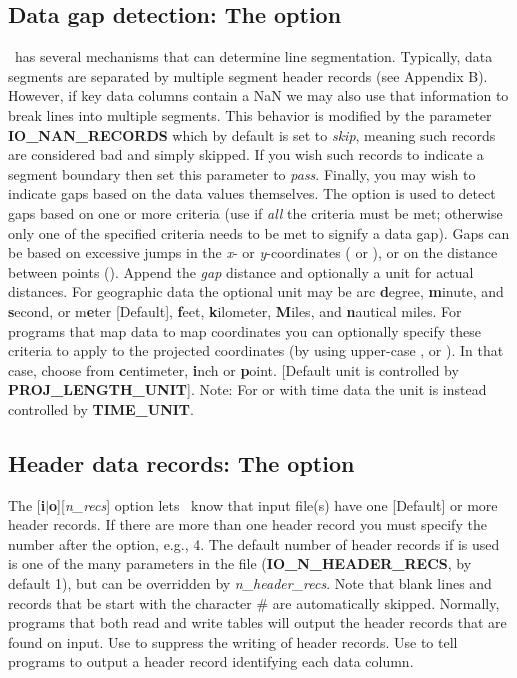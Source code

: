 \subsection{Data gap detection: The  option}
\label{sec:gap}
\GMT\ has several mechanisms that can determine line segmentation.  Typically, data segments are
separated by multiple segment header records (see Appendix B).  However, if key data
columns contain a NaN we may also use that information to break lines into multiple
segments.  This behavior is modified by the parameter \textbf{IO\_NAN\_RECORDS} which
by default is set to {\it skip}, meaning such records are considered bad and simply
skipped.  If you wish such records to indicate a segment boundary then set this parameter
to {\it pass}.  Finally, you may wish to indicate gaps based on the data values themselves.
The  option is used to detect gaps based on one or more criteria (use  if
\emph{all} the criteria must be met; otherwise only one of the specified criteria needs
to be met to signify a data gap).  Gaps can be based on excessive jumps in the {\it x}- or
{\it y}-coordinates ( or ), or on the distance between points ().
Append the {\it gap} distance and optionally a unit for actual distances.
For geographic data the optional unit may be arc {\bf d}egree, {\bf m}inute, and {\bf s}econd,
or m{\bf e}ter [Default], {\bf f}eet, {\bf k}ilometer, {\bf M}iles, and {\bf n}autical miles.
For programs that map data to map coordinates you can optionally specify these criteria to apply to
the projected coordinates (by using upper-case ,  or ).
In that case, choose from {\bf c}entimeter, {\bf i}nch or {\bf p}oint.
[Default unit is controlled by \textbf{PROJ\_LENGTH\_UNIT}].
Note: For  or  with time data the unit is instead controlled by \textbf{TIME\_UNIT}.

\subsection{Header data records: The  option}
\label{sec:header}
The [\textbf{i}$|$\textbf{o}][\emph{n\_recs}] option lets \GMT\ know that input file(s) have
one [Default] or more header records.  If there are more than one header
record you must specify the number after the  option, e.g., 4.  The
default number of header records if  is used is one of the many parameters
in the  file (\textbf{IO\_N\_HEADER\_RECS}, by default 1),
but can be overridden by \emph{n\_header\_recs}.
Note that blank lines and records that be start with the character \# are
automatically skipped.  Normally, programs that both read and write tables will
output the header records that are found on input.  Use  to suppress the
writing of header records.  Use  to tell programs to output a header record
identifying each data column.

